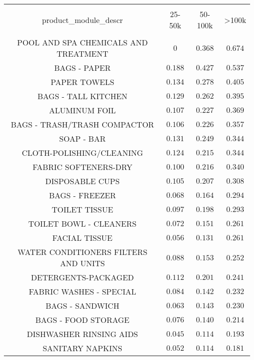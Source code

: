 
\begin{table}[!htbp] \centering
  \caption{}
  \label{tab:appendixDiscountingBehaviorChannelNonFoodAddDiscount}
\begin{tabular}{@{\extracolsep{5pt}} cccc}
\\[-1.8ex]\hline
\hline \\[-1.8ex]
product\_module\_descr & 25-50k & 50-100k & \textgreater 100k \\
\hline \\[-1.8ex]
POOL AND SPA CHEMICALS AND TREATMENT & $0$ & $0.368$ & $0.674$ \\
BAGS - PAPER & $0.188$ & $0.427$ & $0.537$ \\
PAPER TOWELS & $0.134$ & $0.278$ & $0.405$ \\
BAGS - TALL KITCHEN & $0.129$ & $0.262$ & $0.395$ \\
ALUMINUM FOIL & $0.107$ & $0.227$ & $0.369$ \\
BAGS - TRASH/TRASH COMPACTOR & $0.106$ & $0.226$ & $0.357$ \\
SOAP - BAR & $0.131$ & $0.249$ & $0.344$ \\
CLOTH-POLISHING/CLEANING & $0.124$ & $0.215$ & $0.344$ \\
FABRIC SOFTENERS-DRY & $0.100$ & $0.216$ & $0.340$ \\
DISPOSABLE CUPS & $0.105$ & $0.207$ & $0.308$ \\
BAGS - FREEZER & $0.068$ & $0.164$ & $0.294$ \\
TOILET TISSUE & $0.097$ & $0.198$ & $0.293$ \\
TOILET BOWL - CLEANERS & $0.072$ & $0.151$ & $0.261$ \\
FACIAL TISSUE & $0.056$ & $0.131$ & $0.261$ \\
WATER CONDITIONERS FILTERS AND UNITS & $0.088$ & $0.153$ & $0.252$ \\
DETERGENTS-PACKAGED & $0.112$ & $0.201$ & $0.241$ \\
FABRIC WASHES - SPECIAL & $0.084$ & $0.142$ & $0.232$ \\
BAGS - SANDWICH & $0.063$ & $0.143$ & $0.230$ \\
BAGS - FOOD STORAGE & $0.076$ & $0.140$ & $0.214$ \\
DISHWASHER RINSING AIDS & $0.045$ & $0.114$ & $0.193$ \\
SANITARY NAPKINS & $0.052$ & $0.114$ & $0.181$ \\

\end{tabular}
\end{table}
